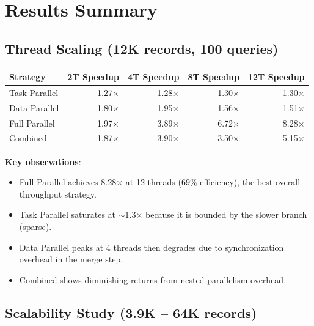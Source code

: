 \documentclass[11pt]{article}
\begin{document}
\section{Results Summary}

\subsection{Thread Scaling (12K records, 100 queries)}

\begin{center}
\begin{tabular}{lrrrr}
\toprule
\textbf{Strategy} & \textbf{2T Speedup} & \textbf{4T Speedup} & \textbf{8T Speedup} & \textbf{12T Speedup} \\
\midrule
Task Parallel     & 1.27$\times$ & 1.28$\times$ & 1.30$\times$ & 1.30$\times$ \\
Data Parallel     & 1.80$\times$ & 1.95$\times$ & 1.56$\times$ & 1.51$\times$ \\
Full Parallel     & 1.97$\times$ & 3.89$\times$ & 6.72$\times$ & 8.28$\times$ \\
Combined          & 1.87$\times$ & 3.90$\times$ & 3.50$\times$ & 5.15$\times$ \\
\bottomrule
\end{tabular}
\end{center}

\noindent \textbf{Key observations}:
\begin{itemize}[nosep]
    \item Full Parallel achieves 8.28$\times$ at 12 threads (69\% efficiency), the best overall throughput strategy.
    \item Task Parallel saturates at $\sim$1.3$\times$ because it is bounded by the slower branch (sparse).
    \item Data Parallel peaks at 4 threads then degrades due to synchronization overhead in the merge step.
    \item Combined shows diminishing returns from nested parallelism overhead.
\end{itemize}

\subsection{Scalability Study (3.9K -- 64K records)}
\end{document}
